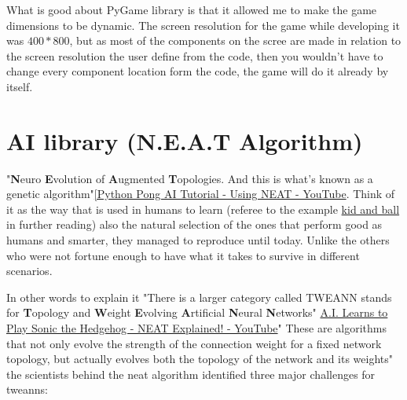 What is good about PyGame library is that it allowed me to make the game dimensions to be dynamic. The screen resolution for the game while developing it was $400*800$, but as most of the components on the scree are made in relation to the screen resolution the user define from the code, then you wouldn't have to change every component location form the code, the game will do it already by itself. 

\section{AI library (N.E.A.T Algorithm)}\label{sec:ai-library-neat-algorithm}
"\textbf{N}euro \textbf{E}volution of \textbf{A}ugmented \textbf{T}opologies. And this is what's known as a genetic algorithm"\href{https://www.youtube.com/watch?v=2f6TmKm7yx0}{[Python Pong AI Tutorial - Using NEAT - YouTube}. Think of it as the way that is used in humans to learn (referee to the example \hyperref[sec:ai-life-example]{kid and ball} in further reading) also the natural selection of the ones that perform good as humans and smarter, they managed to reproduce until today. Unlike the others who were not fortune enough to have what it takes to survive in different scenarios.

In other words to explain it "There is a larger category called TWEANN stands for \textbf{T}opology and \textbf{W}eight \textbf{E}volving \textbf{A}rtificial \textbf{N}eural \textbf{N}etworks" \href{https://www.youtube.com/watch?v=5RR1T_-zVws&}{A.I. Learns to Play Sonic the Hedgehog - NEAT Explained! - YouTube}" These are algorithms that not only evolve the strength of the connection weight for a fixed network topology, but actually evolves both the topology of the network and its weights" the scientists behind the neat algorithm identified three major challenges for tweanns:

